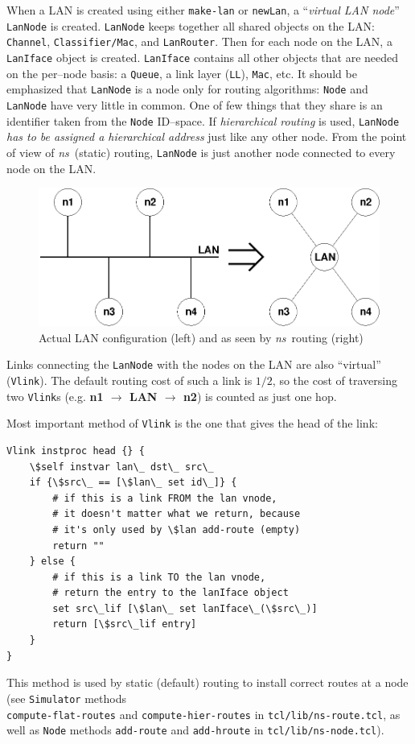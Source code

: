 When a LAN is created using either {\tt make-lan} or {\tt newLan}, a
``\textit{virtual LAN node}'' {\tt LanNode} is created.
{\tt LanNode} keeps together all shared objects on the LAN:
{\tt Channel}, {\tt Classifier/Mac}, and {\tt LanRouter}.  Then for
each node on the LAN, a {\tt LanIface} object is created.
{\tt LanIface} contains all other objects that are needed on the
per--node basis: a {\tt Queue}, a link layer ({\tt LL}),
{\tt Mac}, etc.  It should be emphasized that {\tt LanNode} is a
node only for routing algorithms:  {\tt Node} and {\tt LanNode} have
very little in common.  One of few things that they share is an
identifier taken from the {\tt Node} ID--space.  If
\textit{hierarchical routing} is used, {\tt LanNode} \textit{has to be
assigned a hierarchical address} just like any other node.  From the
point of view of \emph{ns}\ (static) routing, {\tt LanNode} is just another
node connected to every node on the LAN.
\begin{figure}[hbt]
	\centerline{\includegraphics{lan2}}
  	\caption{Actual LAN configuration (left) and as seen by
  	\emph{ns}\ routing (right)}
  	\label{fig:lan-routing1}
\end{figure}
Links connecting the {\tt LanNode} with the nodes on the LAN are also
``virtual'' ({\tt Vlink}).  The default routing cost of such a link
is $1/2$, so the cost of traversing two {\tt Vlink}s
(e.g. \textbf{n1 $\rightarrow$ LAN $\rightarrow$ n2}) is counted as just one
hop.  

Most important method of {\tt Vlink} is the one that gives the head
of the link:
\begin{verbatim}
Vlink instproc head {} {
    \$self instvar lan\_ dst\_ src\_
    if {\$src\_ == [\$lan\_ set id\_]} {
        # if this is a link FROM the lan vnode, 
        # it doesn't matter what we return, because
        # it's only used by \$lan add-route (empty)
        return ""
    } else {
        # if this is a link TO the lan vnode, 
        # return the entry to the lanIface object
        set src\_lif [\$lan\_ set lanIface\_(\$src\_)]
        return [\$src\_lif entry]
    }
}
\end{verbatim}
This method is used by static (default) routing to install correct
routes at a  node (see {\tt Simulator} methods \\ {\tt compute-flat-routes} and
{\tt compute-hier-routes} in {\tt tcl/lib/ns-route.tcl}, as well
as {\tt Node} methods {\tt add-route} and {\tt add-hroute} in
{\tt tcl/lib/ns-node.tcl}).  

